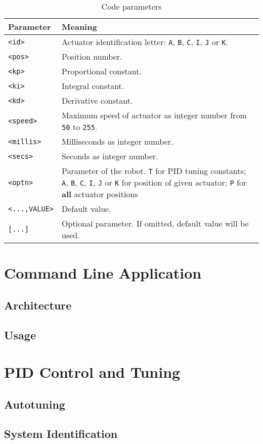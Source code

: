 \begingroup
\setlength{\tabcolsep}{10pt}
\renewcommand{\arraystretch}{1.5}
\begin{table}[]
    \centering
    \caption{Code parameters}
    \label{tab:code-parameters}
    \begin{tabular}{p{}p{}}
    \toprule
    Parameter & Meaning \\ \midrule
    \texttt{<id>} & Actuator identification letter: \texttt{A}, \texttt{B}, \texttt{C}, \texttt{I}, \texttt{J} or \texttt{K}. \\
    \texttt{<pos>} & Position number. \\
    \texttt{<kp>} & Proportional constant. \\
    \texttt{<ki>} & Integral constant. \\
    \texttt{<kd>} & Derivative constant. \\
    \texttt{<speed>} & Maximum speed of actuator as integer number from \texttt{50} to \texttt{255}. \\
    \texttt{<millis>} & Milliseconds as integer number. \\
    \texttt{<secs>} & Seconds as integer number. \\
    \texttt{<optn>} & Parameter of the robot. \texttt{T} for PID tuning constants; \texttt{A}, \texttt{B}, \texttt{C}, \texttt{I}, \texttt{J} or \texttt{K} for position of given actuator; \texttt{P} for \textbf{all} actuator positions\\
    \texttt{<...,VALUE>} & Default value. \\
    \texttt{[...]} & Optional parameter. If omitted, default value will be used. \\
    \bottomrule
    \end{tabular}
\end{table}
\endgroup

\section{Command Line Application}

\subsection{Architecture}


\subsection{Usage}


\section{PID Control and Tuning}

\subsection{Autotuning}


\subsection{System Identification}

